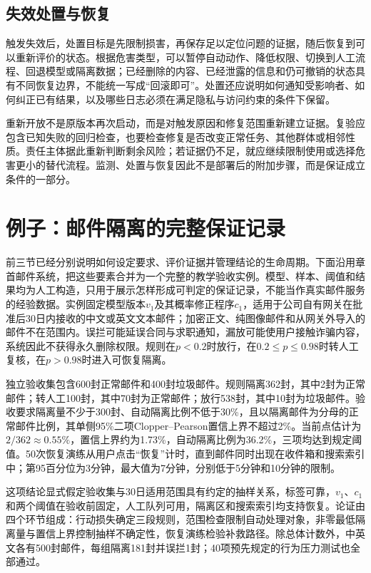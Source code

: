 \subsection{失效处置与恢复}

触发失效后，处置目标是先限制损害，再保存足以定位问题的证据，随后恢复到可以重新评价的状态。根据危害类型，可以暂停自动动作、降低权限、切换到人工流程、回退模型或隔离数据；已经删除的内容、已经泄露的信息和仍可撤销的状态具有不同恢复边界，不能统一写成“回滚即可”。处置还应说明如何通知受影响者、如何纠正已有结果，以及哪些日志必须在满足隐私与访问约束的条件下保留。

重新开放不是原版本再次启动，而是对触发原因和修复范围重新建立证据。复验应包含已知失败的回归检查，也要检查修复是否改变正常任务、其他群体或相邻性质。责任主体据此重新判断剩余风险；若证据仍不足，就应继续限制使用或选择危害更小的替代流程。监测、处置与恢复因此不是部署后的附加步骤，而是保证成立条件的一部分。

\section{例子：邮件隔离的完整保证记录}
\label{sec:trust-mail-assurance}

前三节已经分别说明如何设定要求、评价证据并管理结论的生命周期。下面沿用章首邮件系统，把这些要素合并为一个完整的教学验收实例。模型、样本、阈值和结果均为人工构造，只用于展示怎样形成可判定的保证记录，不能当作真实邮件服务的经验数据。实例固定模型版本$v_1$及其概率修正程序$c_1$，适用于公司自有网关在批准后30日内接收的中文或英文文本邮件；加密正文、纯图像邮件和从网关外导入的邮件不在范围内。误拦可能延误合同与求职通知，漏放可能使用户接触诈骗内容，系统因此不获得永久删除权限。规则在$p<0.2$时放行，在$0.2\leq p\leq0.98$时转人工复核，在$p>0.98$时进入可恢复隔离。

独立验收集包含600封正常邮件和400封垃圾邮件。规则隔离362封，其中2封为正常邮件；转人工100封，其中70封为正常邮件；放行538封，其中10封为垃圾邮件。验收要求隔离量不少于300封、自动隔离比例不低于30\%，且以隔离邮件为分母的正常邮件比例，其单侧95\%二项Clopper--Pearson置信上界不超过2\%。当前点估计为$2/362\approx0.55\%$，置信上界约为1.73\%，自动隔离比例为36.2\%，三项均达到规定阈值。50次恢复演练从用户点击“恢复”计时，直到邮件同时出现在收件箱和搜索索引中；第95百分位为3分钟，最大值为7分钟，分别低于5分钟和10分钟的限制。

这项结论显式假定验收集与30日适用范围具有约定的抽样关系，标签可靠，$v_1$、$c_1$和两个阈值在验收前固定，人工队列可用，隔离区和搜索索引均支持恢复。论证由四个环节组成：行动损失确定三段规则，范围检查限制自动处理对象，非零最低隔离量与置信上界控制抽样不确定性，恢复演练检验补救路径。除总体计数外，中英文各有500封邮件，每组隔离181封并误拦1封；40项预先规定的行为压力测试也全部通过。

